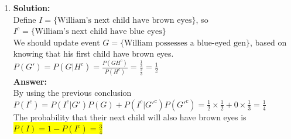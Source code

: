 \documentclass{article}
\newcommand{\myansw}{\textbf{Answer:}\\}
\newcommand{\mysolu}{\textbf{Solution:}\\}
\begin{document}
\begin{enumerate}
\begin{enumerate}
		${P(H) = P(HG)+P(HG^c)={P(H|G)}{P(G)}+{P(H|G^c)}{P(G^c)}}$\\
		\myansw
		The probability that their first child will have blue eyes is\\
		\colorbox{yellow}{${P(H) = \frac{1}{2} \times \frac{2}{3}+\frac{1}{3} \times 0 = \frac{1}{3}}$}\\
		\item
		\mysolu
		Define ${I = \{\text{William's next child have brown eyes}\}}$, so ${I^c = \{\text{William's next child have blue eyes}\}}$\\
		We should update event ${G = \{\text{William possesses a blue-eyed gen}\}}$, based on knowing that his first child have brown eyes.\\
		${P(G')=P(G|H^c)=\frac{P(GH^c)}{P(H^c)}=\frac{\frac{1}{3}}{\frac{2}{3}}=\frac{1}{2}}$\\
		\myansw
		By using the previous conclusion\\
		${P(I^c)= P(I^c|G')P(G)+P(I^c|G'^c)P(G'^c)=\frac{1}{2}\times \frac{1}{2}+0 \times \frac{1}{3} = \frac{1}{4}}$\\
		The probability that their next child will also have brown eyes is\\
		\colorbox{yellow}{${P(I)=1-P(I^c) = \frac{3}{4}}$} \\
		

\end{enumerate}
\end{enumerate}
\end{document}
